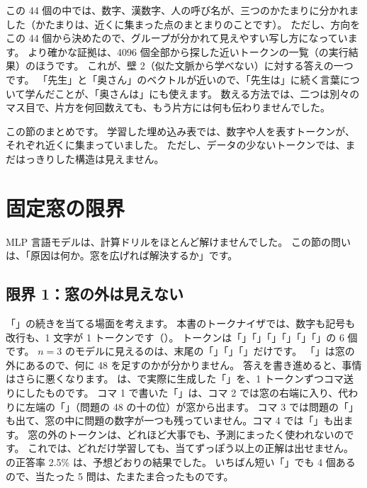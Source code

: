この 44 個の中では、数字、漢数字、人の呼び名が、三つのかたまりに分かれました（かたまりは、近くに集まった点のまとまりのことです）。
ただし、方向をこの 44 個から決めたので、グループが分かれて見えやすい写し方になっています。
より確かな証拠は、4096 個全部から探した近いトークンの一覧（の実行結果）のほうです。
これが、壁 2（似た文脈から学べない）に対する答えの一つです。
「先生」と「奥さん」のベクトルが近いので、「先生は」に続く言葉について学んだことが、「奥さんは」にも使えます。
数える方法では、二つは別々のマス目で、片方を何回数えても、もう片方には何も伝わりませんでした。

この節のまとめです。
学習した埋め込み表では、数字や人を表すトークンが、それぞれ近くに集まっていました。
ただし、データの少ないトークンでは、まだはっきりした構造は見えません。

\section{固定窓の限界}\label{sec:emb-window}

MLP 言語モデルは、計算ドリルをほとんど解けませんでした。
この節の問いは、「原因は何か。窓を広げれば解決するか」です。

\subsection*{限界 1：窓の外は見えない}

「」の続きを当てる場面を考えます。
本書のトークナイザでは、数字も記号も改行も、1 文字が 1 トークンです（）。
トークンは「」「」「\code{+}」「」「」「\code{=}」の 6 個です。
$n=3$ のモデルに見えるのは、末尾の「」「」「\code{=}」だけです。
「」は窓の外にあるので、何に 48 を足すのかが分かりません。
答えを書き進めると、事情はさらに悪くなります。
は、で実際に生成した「」を、1 トークンずつコマ送りにしたものです。
コマ 1 で書いた「」は、コマ 2 では窓の右端に入り、代わりに左端の「」（問題の 48 の十の位）が窓から出ます。
コマ 3 では問題の「」も出て、窓の中に問題の数字が一つも残っていません。コマ 4 では「\code{=}」も出ます。
窓の外のトークンは、どれほど大事でも、予測にまったく使われないのです。
これでは、どれだけ学習しても、当てずっぽう以上の正解は出せません。
の正答率 2.5\% は、予想どおりの結果でした。
いちばん短い「」でも 4 個あるので、当たった 5 問は、たまたま合ったものです。

